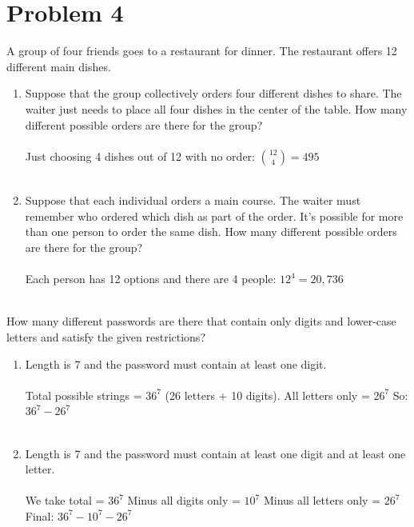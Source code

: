 \documentclass{amsart}
\theoremstyle{definition}
\theoremstyle{Exercise}
\theoremstyle{remark}
\theoremstyle{rule}
\numberwithin{equation}{section}
\begin{document}
\section*{Problem 4}
A group of four friends goes to a restaurant for dinner. The restaurant offers 12 different main dishes.\\
    \begin{enumerate}[label=(\roman*)]
    \item Suppose that the group collectively orders four different dishes to share. The waiter just needs to place all four dishes in the center of the table. How many different possible orders are there for the group?\\\\
Just choosing 4 dishes out of 12 with no order: $\binom{12}{4} = 495$
\\\\

    \item Suppose that each individual orders a main course. The waiter must remember who ordered which dish as part of the order. It's possible for more than one person to order the same dish. How many different possible orders are there for the group?\\\\
Each person has 12 options and there are 4 people: $12^4 = 20,736$
\\\\

    \end{enumerate}


How many different passwords are there that contain only digits and lower-case letters and satisfy the given restrictions?\\
      \begin{enumerate}[label=(\roman*), start=3]
    \item Length is 7 and the password must contain at least one digit.\\\\
Total possible strings = $36^7$ (26 letters + 10 digits).
All letters only = $26^7$
So: $36^7 - 26^7$
\\\\

     \item Length is 7 and the password must contain at least one digit and at least one letter.\\\\
We take total = $36^7$
Minus all digits only = $10^7$
Minus all letters only = $26^7$
Final: $36^7 - 10^7 - 26^7$
\\\\
    \end{enumerate}
 
\end{document}
